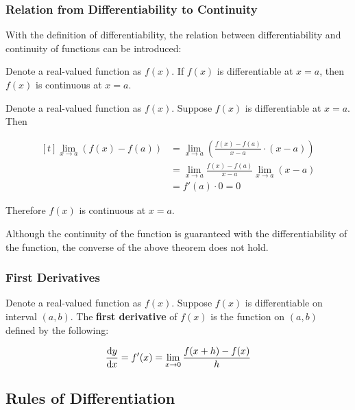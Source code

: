 \documentclass[a4paper,12pt]{article}
\begin{document}
\subsubsection{Relation from Differentiability to Continuity}
With the definition of differentiability, the relation between differentiability and continuity of functions can be introduced:\n

\begin{thm}
  Denote a real-valued function as $f(x)$. If $f(x)$ is differentiable at $x=a$, then $f(x)$ is continuous at $x=a$.\n

  \prf Denote a real-valued function as $f(x)$. Suppose $f(x)$ is differentiable at $x=a$. Then

  $$\begin{aligned}[t]
    \lim_{x\to a}(f(x)-f(a))&=\lim_{x\to a}(\frac{f(x)-f(a)}{x-a}\cdot (x-a))\\
    &=\lim_{x\to a}\frac{f(x)-f(a)}{x-a}\lim_{x\to a}(x-a)\\
    &=f'(a)\cdot 0=0
  \end{aligned}$$\s

  Therefore $f(x)$ is continuous at $x=a$.
\end{thm}\n

Although the continuity of the function is guaranteed with the differentiability of the function, the converse of the above theorem does not hold.

\subsubsection{First Derivatives}
\begin{dft}
  Denote a real-valued function as $f(x)$. Suppose $f(x)$ is differentiable on interval $(a,b)$. The \textbf{first derivative} of $f(x)$ is the function on $(a,b)$ defined by the following:

  $$\frac{\mathrm{d}  y}{\mathrm{d}  x}=f'(x)=\lim_{x\to 0}\frac{f(x+h)-f(x)}{h}$$
\end{dft}

\subsection{Rules of Differentiation}
\end{document}
